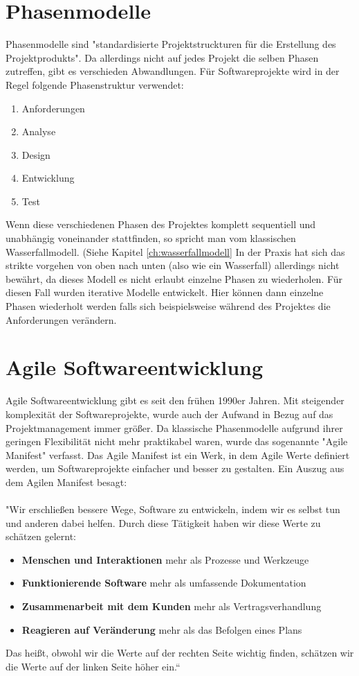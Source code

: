 \documentclass[a4paper, twopage]{scrreprt}
\begin{document}
\newpage

\section{Phasenmodelle}
\label{sec:phasenmodelle}
Phasenmodelle sind "standardisierte Projektstruckturen für die Erstellung des Projektprodukts".\cite{wikipedia:projektphase}
Da allerdings nicht auf jedes Projekt die selben Phasen zutreffen, gibt es verschieden Abwandlungen. Für Softwareprojekte wird in der Regel folgende Phasenstruktur verwendet:
\begin{enumerate}
	\item Anforderungen
	\item Analyse
	\item Design
	\item Entwicklung
	\item Test
\end{enumerate}
Wenn diese verschiedenen Phasen des Projektes komplett sequentiell und unabhängig voneinander stattfinden, so spricht man vom klassischen Wasserfallmodell. (Siehe Kapitel \ref{ch:wasserfallmodell}
In der Praxis hat sich das strikte vorgehen von oben nach unten (also wie ein Wasserfall) allerdings nicht bewährt, da dieses Modell es nicht erlaubt einzelne Phasen zu wiederholen.
Für diesen Fall wurden iterative Modelle entwickelt. Hier können dann einzelne Phasen wiederholt werden falls sich beispielsweise während des Projektes die Anforderungen verändern.
\section{Agile Softwareentwicklung}
\label{sec:agile_softwareentwicklung}
Agile Softwareentwicklung gibt es seit den frühen 1990er Jahren. Mit steigender komplexität der Softwareprojekte, wurde auch der Aufwand in Bezug auf das Projektmanagement immer größer. Da klassische Phasenmodelle aufgrund ihrer geringen Flexibilität nicht mehr praktikabel waren, wurde das sogenannte "Agile Manifest" verfasst. Das Agile Manifest ist ein Werk, in dem Agile Werte definiert werden, um Softwareprojekte einfacher und besser zu gestalten. Ein Auszug aus dem Agilen Manifest besagt: \paragraph*{}
"Wir erschließen bessere Wege, Software zu entwickeln, indem wir es selbst tun und anderen dabei helfen. Durch diese Tätigkeit haben wir diese Werte zu schätzen gelernt:
\begin{itemize}
	\item \textbf{Menschen und Interaktionen} mehr als Prozesse und Werkzeuge
	\item \textbf{Funktionierende Software} mehr als umfassende Dokumentation
	\item \textbf{Zusammenarbeit mit dem Kunden} mehr als Vertragsverhandlung
	\item \textbf{Reagieren auf Veränderung} mehr als das Befolgen eines Plans
\end{itemize}
Das heißt, obwohl wir die Werte auf der rechten Seite wichtig finden, schätzen wir die Werte auf der linken Seite höher ein.“\cite{agilemanifesto}
\end{document}
